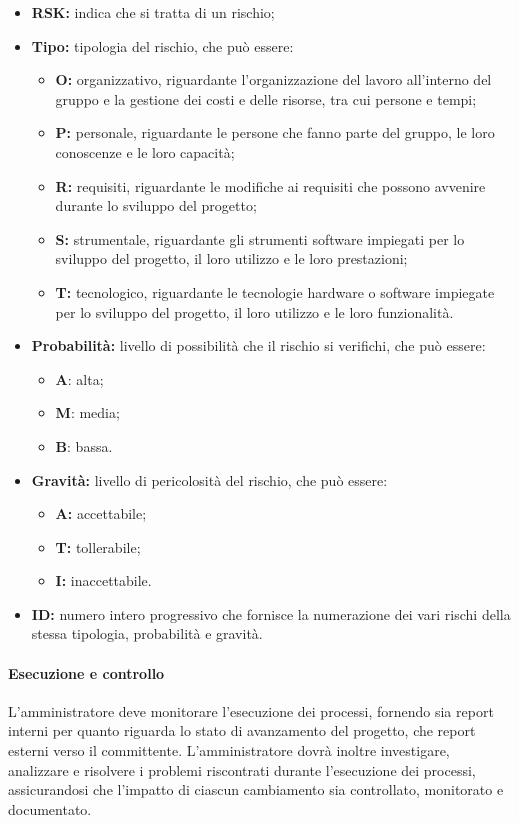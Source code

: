 			\begin{itemize}
				\item \textbf{RSK:} indica che si tratta di un rischio;
				\item \textbf{Tipo:} tipologia del rischio, che può essere:
				\begin{itemize}
					\item \textbf{O:} organizzativo, riguardante l'organizzazione del lavoro all'interno del gruppo e la gestione dei costi e delle risorse, tra cui persone e tempi;
					\item \textbf{P:} personale, riguardante le persone che fanno parte del gruppo, le loro conoscenze e le loro capacità;
					\item \textbf{R:} requisiti, riguardante le modifiche ai requisiti che possono avvenire durante lo sviluppo del progetto;
					\item \textbf{S:} strumentale, riguardante gli strumenti software impiegati per lo sviluppo del progetto, il loro utilizzo e le loro prestazioni;
					\item \textbf{T:} tecnologico, riguardante le tecnologie hardware o software impiegate per lo sviluppo del progetto, il loro utilizzo e le loro funzionalità.
				\end{itemize}
				\item \textbf{Probabilità:} livello di possibilità che il rischio si verifichi, che può essere:
				\begin{itemize}
					\item \textbf{A}: alta;
					\item \textbf{M}: media;
					\item \textbf{B}: bassa.
				\end{itemize}
				\item \textbf{Gravità:} livello di pericolosità del rischio, che può essere:
				\begin{itemize}
					\item \textbf{A:} accettabile;
					\item \textbf{T:} tollerabile;
					\item \textbf{I:} inaccettabile.
				\end{itemize}
				\item \textbf{ID:} numero intero progressivo che fornisce la numerazione dei vari rischi della stessa tipologia, probabilità e gravità.

			\end{itemize}

		\paragraph{Esecuzione e controllo}
			L'amministratore deve monitorare l'esecuzione dei processi, fornendo sia report interni per quanto riguarda lo stato di avanzamento del progetto, che report esterni verso il committente.
			L'amministratore dovrà inoltre investigare, analizzare e risolvere i problemi riscontrati durante l'esecuzione dei processi, assicurandosi che l'impatto di ciascun cambiamento sia controllato, monitorato e documentato.

